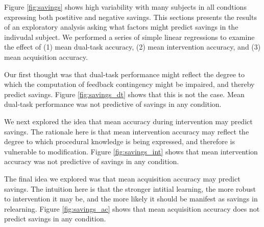 Figure \ref{fig:savings} shows high variability with many subjects in all
condtions expressing both postitive and negative savings. This sections presents
the results of an exploratory analysis asking what factors might predict savings
in the indivudal subject. We performed a series of simple linear regressions to
examine the effect of (1) mean dual-task accuracy, (2) mean intervention
accuracy, and (3) mean acquisition accuracy.

Our first thought was that dual-task performance might reflect the degree to
which the computation of feedback contingency might be impaired, and thereby
predict savings. Figure \ref{fig:savings_dt} shows that this is not the case.
Mean dual-task performance was not predictive of savings in any condition. 

We next explored the idea that mean accuracy during intervention may predict
savings. The rationale here is that mean intervention accuracy may reflect the
degree to which procedural knowledge is being expressed, and therefore is
vulnerable to modification. Figure \ref{fig:savings_int} shows that mean
intervention accuracy was not predictive of savings in any condition.

The final idea we explored was that mean acquisition accuracy may predict
savings. The intuition here is that the stronger intitial learning, the more
robust to intervention it may be, and the more likely it should be manifest as
savings in relearning. Figure \ref{fig:savings_ac} shows that mean acquisition
accuracy does not predict savings in any condition.

